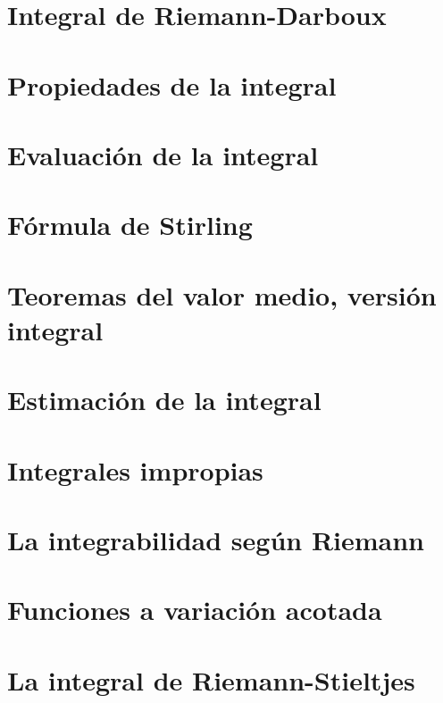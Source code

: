 \documentclass[12pt,]{krantz}
\theoremstyle{definition}
\theoremstyle{definition}
\theoremstyle{definition}
\theoremstyle{remark}
\begin{document}
\section{Integral de Riemann-Darboux}\label{integral-de-riemann-darboux}

\section{Propiedades de la integral}\label{propiedades-de-la-integral}

\section{Evaluación de la integral}\label{evaluacion-de-la-integral}

\section{Fórmula de Stirling}\label{formula-de-stirling}

\section{Teoremas del valor medio, versión
integral}\label{teoremas-del-valor-medio-version-integral}

\section{Estimación de la integral}\label{estimacion-de-la-integral}

\section{Integrales impropias}\label{integrales-impropias}

\section{La integrabilidad según
Riemann}\label{la-integrabilidad-segun-riemann}

\section{Funciones a variación
acotada}\label{funciones-a-variacion-acotada}

\section{La integral de
Riemann-Stieltjes}\label{la-integral-de-riemann-stieltjes}
\end{document}
